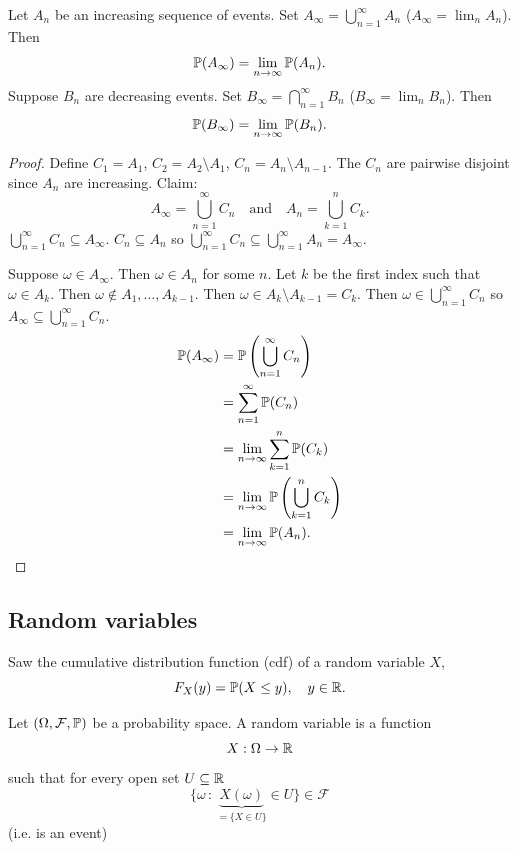 \documentclass[10pt, a4paper]{article}
\begin{document}
\begin{theorem}
    Let $A_n$ be an increasing sequence of events.
    Set $A_{\infty} = \bigcup_{n = 1}^{\infty}A_n$
    ($A_{\infty} = \lim_{n}A_n$).
    Then
    \[
    \P(A_{\infty}) = \lim_{n \to \infty}\P(A_n).
    \]
    Suppose $B_n$ are decreasing events.
    Set $B_{\infty} = \bigcap_{n = 1}^{\infty}B_n$
    ($B_{\infty} = \lim_{n}B_n$).
    Then
    \[
    \P(B_{\infty}) = \lim_{n \to \infty}\P(B_n).
    \]

    \begin{proof}
        Define $C_1 = A_1$,
        $C_2 = A_2 \setminus A_1$,
        $C_n = A_n \setminus A_{n - 1}$.
        The $C_n$ are pairwise disjoint since $A_n$ are increasing.
        Claim:
        \[
        A_{\infty} = \bigcup_{n = 1}^{\infty}C_n\quad\text{and}\quad A_n = \bigcup_{k = 1}^{n}C_k.
        \]
        $\bigcup_{n = 1}^{\infty}C_n \subseteq A_{\infty}$.
        $C_n \subseteq A_n$ so $\bigcup_{n = 1}^{\infty}C_n \subseteq \bigcup_{n = 1}^{\infty}A_n = A_{\infty}$.

        Suppose $\omega \in A_{\infty}$.
        Then $\omega \in A_n$ for some $n$.
        Let $k$ be the first index such that $\omega \in A_k$.
        Then $\omega \notin A_1, \dotsc, A_{k - 1}$.
        Then $\omega \in A_k \setminus A_{k - 1} = C_k$.
        Then $\omega \in \bigcup_{n = 1}^{\infty}C_n$ so $A_{\infty} \subseteq \bigcup_{n = 1}^{\infty}C_n$.
        \begin{align*}
            \P(A_{\infty}) &= \P\left(\bigcup_{n = 1}^{\infty}C_n\right) \\
            &= \sum_{n = 1}^{\infty}\P(C_n) \\
            &= \lim_{n \to \infty}\sum_{k = 1}^{n}\P(C_k) \\
            &= \lim_{n \to \infty}\P\left(\bigcup_{k = 1}^{n}C_k\right) \\
            &= \lim_{n \to \infty}\P(A_n).
        \end{align*}
    \end{proof}
\end{theorem}

\subsection{Random variables}
Saw the cumulative distribution function
(cdf)
of a random variable $X$,
\[
F_{X}(y) = \P(X \leq y),\quad y \in \R.
\]

\begin{definition}
    Let $(\Omega, \mathcal{F}, \P)$ be a probability space.
    A random variable is a function
    \[
    X : \Omega \to \R
    \]
    such that for every open set $U \subseteq \R$
    \[
    \{\omega\,:\, \underbrace{X(\omega)}_{= \{X \in U\}} \in U\} \in \mathcal{F}
    \]
    (i.e. is an event)
\end{definition}
\end{document}
